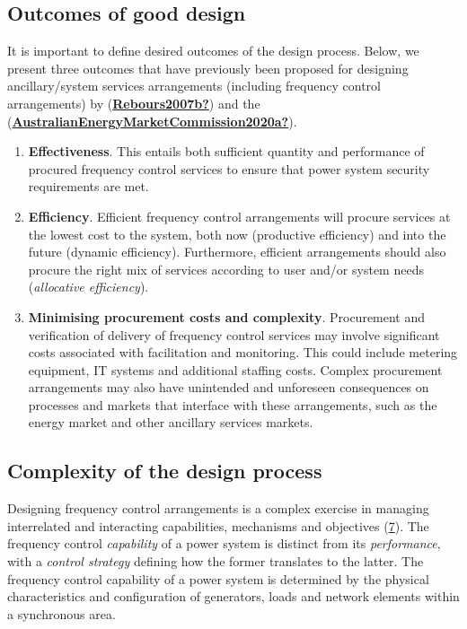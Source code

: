 \documentclass[12pt,a4paper,]{report}
\begin{document}
\hypertarget{outcomes-of-good-design}{%
\subsection{Outcomes of good design}\label{outcomes-of-good-design}}

It is important to define desired outcomes of the design process. Below,
we present three outcomes that have previously been proposed for
designing ancillary/system services arrangements (including frequency
control arrangements) by
(\protect\hyperlink{ref-Rebours2007b}{\textbf{Rebours2007b?}}) and the
(\protect\hyperlink{ref-AustralianEnergyMarketCommission2020a}{\textbf{AustralianEnergyMarketCommission2020a?}}).

\begin{enumerate}
\def\labelenumi{\arabic{enumi}.}
\item
  \textbf{Effectiveness}. This entails both sufficient quantity and
  performance of procured frequency control services to ensure that
  power system security requirements are met.
\item
  \textbf{Efficiency}. Efficient frequency control arrangements will
  procure services at the lowest cost to the system, both now
  (productive efficiency) and into the future (dynamic efficiency).
  Furthermore, efficient arrangements should also procure the right mix
  of services according to user and/or system needs (\emph{allocative
  efficiency}).
\item
  \textbf{Minimising procurement costs and complexity}. Procurement and
  verification of delivery of frequency control services may involve
  significant costs associated with facilitation and monitoring. This
  could include metering equipment, IT systems and additional staffing
  costs. Complex procurement arrangements may also have unintended and
  unforeseen consequences on processes and markets that interface with
  these arrangements, such as the energy market and other ancillary
  services markets.
\end{enumerate}

\hypertarget{complexity-of-the-design-process}{%
\subsection{Complexity of the design
process}\label{complexity-of-the-design-process}}

Designing frequency control arrangements is a complex exercise in
managing interrelated and interacting capabilities, mechanisms and
objectives (\protect\hyperlink{fig:design_complexity}{7}). The frequency
control \emph{capability} of a power system is distinct from its
\emph{performance}, with a \emph{control strategy} defining how the
former translates to the latter. The frequency control capability of a
power system is determined by the physical characteristics and
configuration of generators, loads and network elements within a
synchronous area.
\end{document}
